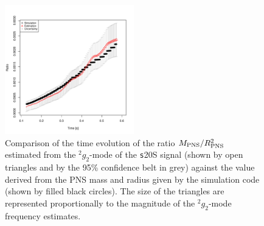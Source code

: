 \documentclass[aps, twocolumn, superscriptaddress, showpacs, nofootinbib, longbibliography]{revtex4-1}
\begin{document}
\begin{figure}
 \centering
 \includegraphics[width=0.5\textwidth]{plots/ratio}
 \caption{Comparison of the time evolution of the ratio $M_{\rm PNS}/R_{\rm PNS}^2$ estimated from the $\mbox{}^2 g_2$-mode of the {\texttt s20S} signal (shown by open triangles and by the 95\% confidence belt in grey) against the value derived from the PNS mass and radius given by the simulation code (shown by filled black circles). The size of the triangles are represented proportionally to the magnitude of the $\mbox{}^2 g_2$-mode frequency estimates. }
 \label{fig:ratio}
\end{figure}




\end{document}
